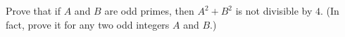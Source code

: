 Prove that if $A$ and $B$ are odd primes, then $A^2+B^2$ is not divisible by $4$. (In fact, prove it for any two odd integers $A$ and $B$.)
